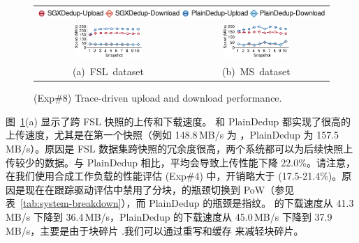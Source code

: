 \begin{figure}[t]
  \centering
  \begin{tabular}{@{\ }c@{\ }c}
  \multicolumn{2}{c}{\includegraphics[width=\textwidth]{pic/sgxdedup/expb2_trace_legend.pdf}} \\
  \hspace{-0.1in}
  \includegraphics[width=0.48\textwidth]{pic/sgxdedup/expb2_trace_fsl_plain_sgx.pdf} &
  \includegraphics[width=0.48\textwidth]{pic/sgxdedup/expb2_trace_ms_plain_sgx.pdf}
  \vspace{-3pt}\\
  \mbox{\small (a) FSL dataset} &
  \mbox{\small (b) MS dataset}
  \end{tabular}
  \vspace{-6pt}
  \caption{(Exp\#8) Trace-driven upload and download performance.}
  \label{fig:tracePerformance}
\end{figure}

图~\ref{fig:tracePerformance}(a) 显示了跨 FSL 快照的上传和下载速度。 \sysnameS 和 PlainDedup 都实现了很高的上传速度，尤其是在第一个快照（例如 148.8\,MB/s \sysnameS 为 ，PlainDedup 为 157.5\,MB/s）。原因是 FSL 数据集跨快照的冗余度很高，两个系统都可以为后续快照上传较少的数据。与 PlainDedup 相比，\sysnameS 平均会导致上传性能下降 22.0\%。请注意，在我们使用合成工作负载的性能评估 (Exp\#4) 中，开销略大于 (17.5-21.4\%)。原因是现在在跟踪驱动评估中禁用了分块，\sysnameS 的瓶颈切换到 PoW（参见表~\ref{tab:system-breakdown}），而 PlainDedup 的瓶颈是指纹。 \sysnameS 的下载速度从 41.3\,MB/s 下降到 36.4\,MB/s，PlainDedup 的下载速度从 45.0\,MB/s 下降到 37.9\,MB/s，主要是由于块碎片 \cite{lillibridge13} .我们可以通过重写和缓存 \cite{lillibridge13,cao18} 来减轻块碎片。

